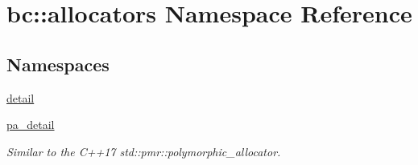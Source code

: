 \hypertarget{namespacebc_1_1allocators}{}\section{bc\+:\+:allocators Namespace Reference}
\label{namespacebc_1_1allocators}
\subsection*{Namespaces}
\begin{DoxyCompactItemize}
\item 
 \hyperlink{namespacebc_1_1allocators_1_1detail}{detail}
\item 
 \hyperlink{namespacebc_1_1allocators_1_1pa__detail}{pa\+\_\+detail}
\begin{DoxyCompactList}\small\item\em Similar to the C++17 std\+::pmr\+::polymorphic\+\_\+allocator. \end{DoxyCompactList}\end{DoxyCompactItemize}

